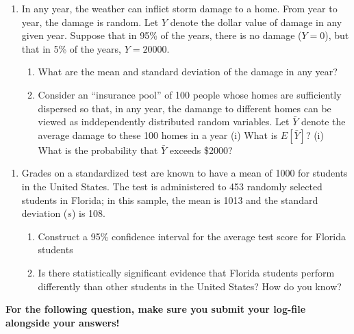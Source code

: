 \documentclass[
]{article}
\begin{document}
\begin{enumerate}
\def\labelenumi{\arabic{enumi}.}
\setcounter{enumi}{4}
\item
  In any year, the weather can inflict storm damage to a home. From year
  to year, the damage is random. Let \(Y\) denote the dollar value of
  damage in any given year. Suppose that in 95\% of the years, there is
  no damage (\(Y=0\)), but that in 5\% of the years, \(Y = 20000\).

  \begin{enumerate}
  \def\labelenumii{\alph{enumii}.}
  \item
    What are the mean and standard deviation of the damage in any year?
  \item
    Consider an ``insurance pool'' of 100 people whose homes are
    sufficiently dispersed so that, in any year, the damange to
    different homes can be viewed as inddependently distributed random
    variables. Let \(\bar{Y}\) denote the average damage to these 100
    homes in a year (i) What is \(E[\bar{Y}]\)? (i) What is the
    probability that \(\bar{Y}\) exceeds \$2000?
  \end{enumerate}
\end{enumerate}

\begin{enumerate}
\def\labelenumi{\arabic{enumi}.}
\setcounter{enumi}{5}
\item
  Grades on a standardized test are known to have a mean of 1000 for
  students in the United States. The test is administered to 453
  randomly selected students in Florida; in this sample, the mean is
  1013 and the standard deviation (\(s\)) is 108.

  \begin{enumerate}
  \def\labelenumii{\alph{enumii}.}
  \item
    Construct a 95\% confidence interval for the average test score for
    Florida students
  \item
    Is there statistically significant evidence that Florida students
    perform differently than other students in the United States? How do
    you know?
  \end{enumerate}
\end{enumerate}

\textbf{For the following question, make sure you submit your log-file
alongside your answers!}
\end{document}
